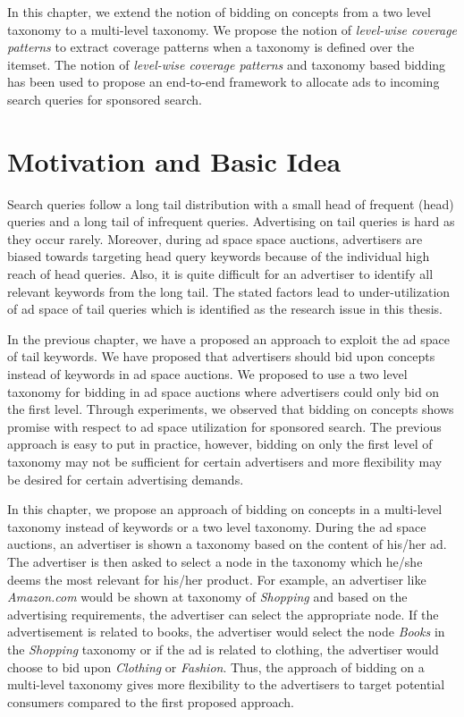 In this chapter, we extend the notion of bidding on concepts from a two level taxonomy to a multi-level taxonomy. We propose the notion of \textit{level-wise coverage patterns} to extract coverage patterns when a taxonomy is defined over the itemset. The notion of \textit{level-wise coverage patterns} and taxonomy based bidding has been used to propose an end-to-end framework to allocate ads to incoming search queries for sponsored search.

\section{Motivation and Basic Idea}

Search queries follow a long tail distribution with a small head of frequent (head) queries and a long tail of infrequent queries. Advertising on tail queries is hard as they occur rarely. Moreover, during ad space space auctions, advertisers are biased towards targeting head query keywords because of the individual high reach of head queries. Also, it is quite difficult for an advertiser to identify all relevant keywords from the long tail. The stated factors lead to under-utilization of ad space of tail queries which is identified as the research issue in this thesis.

In the previous chapter, we have a proposed an approach to exploit the ad space of tail keywords. We have proposed that advertisers should bid upon concepts instead of keywords in ad space auctions. We proposed to use a two level taxonomy for bidding in ad space auctions where advertisers could only bid on the first level. Through experiments, we observed that bidding on concepts shows promise with respect to ad space utilization for sponsored search. The previous approach is easy to put in practice, however, bidding on only the first level of taxonomy may not be sufficient for certain advertisers and more flexibility may be desired for certain advertising demands.


In this chapter, we propose an approach of bidding on concepts in a multi-level taxonomy instead of keywords or a two level taxonomy. During the ad space auctions, an advertiser is shown a taxonomy based on the content of his/her ad. The advertiser is then asked to select a node in the taxonomy which he/she deems the most relevant for his/her product. For example, an advertiser like \textit{Amazon.com} would be shown at taxonomy of \textit{Shopping} and based on the advertising requirements, the advertiser can select the appropriate node. If the advertisement is related to books, the advertiser would select the node \textit{Books} in the \textit{Shopping} taxonomy or if the ad is related to clothing, the advertiser would choose to bid upon \textit{Clothing} or \textit{Fashion}. Thus, the approach of bidding on a multi-level taxonomy gives more flexibility to the advertisers to target potential consumers compared to the first proposed approach.

